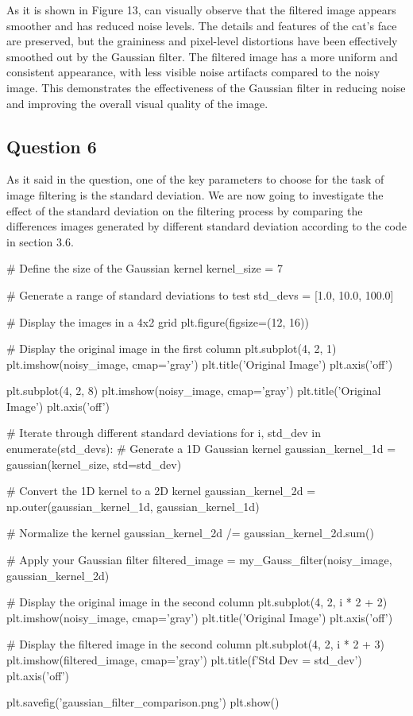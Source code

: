 \documentclass[12pt]{article}
\begin{document}
\quad As it is shown in Figure 13, can visually observe that the filtered image appears smoother and has reduced noise levels. The details and features of the cat's face are preserved, but the graininess and pixel-level distortions have been effectively smoothed out by the Gaussian filter. The filtered image has a more uniform and consistent appearance, with less visible noise artifacts compared to the noisy image. This demonstrates the effectiveness of the Gaussian filter in reducing noise and improving the overall visual quality of the image.
\subsection{Question 6}
\quad As it said in the question, one of the key parameters to choose for the task of image filtering is the standard deviation. We are now going to investigate the effect of the standard deviation on the filtering process by comparing the differences images generated by different standard deviation according to the code in section 3.6.

\begin{python}

# Define the size of the Gaussian kernel
kernel_size = 7

# Generate a range of standard deviations to test
std_devs = [1.0, 10.0, 100.0]

# Display the images in a 4x2 grid
plt.figure(figsize=(12, 16))

# Display the original image in the first column
plt.subplot(4, 2, 1)
plt.imshow(noisy_image, cmap='gray')
plt.title('Original Image')
plt.axis('off')

plt.subplot(4, 2, 8)
plt.imshow(noisy_image, cmap='gray')
plt.title('Original Image')
plt.axis('off')

# Iterate through different standard deviations
for i, std_dev in enumerate(std_devs):
    # Generate a 1D Gaussian kernel
    gaussian_kernel_1d = gaussian(kernel_size, std=std_dev)

    # Convert the 1D kernel to a 2D kernel
    gaussian_kernel_2d = np.outer(gaussian_kernel_1d, gaussian_kernel_1d)

    # Normalize the kernel
    gaussian_kernel_2d /= gaussian_kernel_2d.sum()

    # Apply your Gaussian filter
    filtered_image = my_Gauss_filter(noisy_image, gaussian_kernel_2d)

    # Display the original image in the second column
    plt.subplot(4, 2, i * 2 + 2)
    plt.imshow(noisy_image, cmap='gray')
    plt.title('Original Image')
    plt.axis('off')

    # Display the filtered image in the second column
    plt.subplot(4, 2, i * 2 + 3)
    plt.imshow(filtered_image, cmap='gray')
    plt.title(f'Std Dev = {std_dev}')
    plt.axis('off')

plt.savefig('gaussian_filter_comparison.png')
plt.show()

\end{python}
\end{document}
